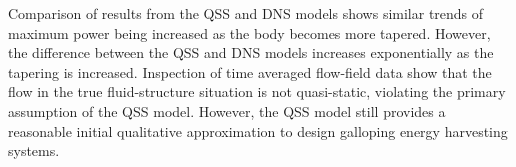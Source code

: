 Comparison of results from the QSS and DNS models shows similar trends of maximum power being increased as the body becomes more tapered. However, the difference between the QSS and DNS models increases exponentially as the tapering is increased. Inspection of time averaged flow-field data show that the flow in the true fluid-structure situation is not quasi-static, violating the primary assumption of the QSS model. However, the QSS model still provides a reasonable initial qualitative approximation to design galloping energy harvesting systems. 
